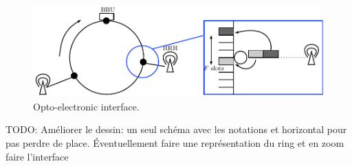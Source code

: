 \documentclass[]{algotel}
\newcommand{\todo}[1]{{\color{red} TODO: {#1}}}
\begin{document}
\begin{figure}[h!]
\begin{center}   

      \includegraphics[scale=0.8]{interface.pdf}
     \caption{Opto-electronic interface.}
     
\end{center}
  \end{figure}
  \todo{Améliorer le dessin: un seul schéma avec les notations et horizontal pour pas perdre de place.
  Éventuellement faire une représentation du ring et en zoom faire l'interface}
%   
%      
%  
   
%    
%   
\end{document}
